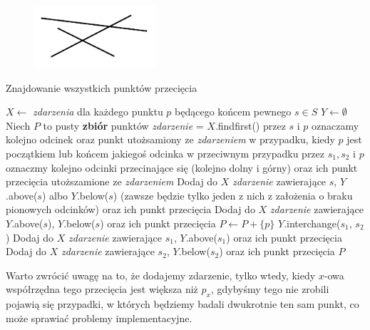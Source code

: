 \begin{figure}[H]
	\centering
	\includegraphics[width=0.4\textwidth]{data/zamiatanie_wariant2_kontrprzyklad.png}
	\caption{  }
	\label{fig:zamiatanie_kontrprzyklad_wariant2}
\end{figure}

\begin{algorithm}[H]
	\caption{Znajdowanie wszystkich punktów przecięcia}
	\begin{algorithmic}[1]
		\State $X \gets$ \textit{zdarzenia} dla każdego punktu $p$ będącego
		końcem pewnego $s \in S$
		\State $Y \gets \emptyset$
		\State Niech $P$ to pusty \textbf{zbiór} punktów
		\State \textit{zdarzenie} = $X.$findfirst()
		\State przez $s$ i $p$ oznaczamy
		kolejno odcinek oraz punkt utożsamiony ze \textit{zdarzeniem} w przypadku,
		kiedy $p$ jest początkiem lub końcem jakiegoś odcinka
		\State w przeciwnym przypadku przez $s_1, s_2$ i $p$ oznaczmy kolejno odcinki przecinające się (kolejno dolny i górny)
		oraz ich punkt przecięcia utoższamione ze \textit{zdarzeniem}
		\State Dodaj do $X$ \textit{zdarzenie} zawierające $s$, $Y$.above($s$)
		albo $Y$.below($s$) (zawsze będzie tylko jeden z nich z założenia o braku pionowych odcinków) oraz ich punkt przecięcia
		\EndIf
		\State Dodaj do $X$ \textit{zdarzenie} zawierające $Y$.above($s$), $Y$.below($s$) oraz ich punkt przecięcia  
		\EndIf
		\Else
		\State $P \gets P + \{p\}$
		\State $Y$.interchange($s_1$, $s_2$)
		\State Dodaj do $X$ \textit{zdarzenie} zawierające $s_1$, $Y$.above($s_1$) oraz ich punkt przecięcia
		\EndIf
		\State Dodaj do $X$ \textit{zdarzenie} zawierające $s_2$, $Y$.below($s_2$) oraz ich punkt przecięcia
		\EndIf
		\EndIf
		\EndWhile
		\State \Return $P$
		\EndProcedure
	\end{algorithmic}
	\label{HasIntersectingSegments2}
\end{algorithm}

Warto zwrócić uwagę na to, że dodajemy zdarzenie, tylko wtedy, kiedy
$x$-owa współrzędna tego przecięcia jest większa niż $p_x$, gdybyśmy tego nie zrobili
pojawią się przypadki, w których będziemy badali dwukrotnie ten sam punkt, co 
może sprawiać problemy implementacyjne.

\subsection{}

